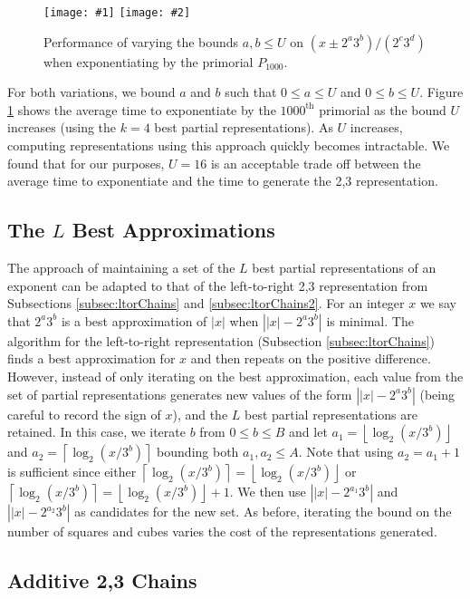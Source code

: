 \documentclass{ucalgthes1}
\theoremstyle{definition}
\newcommand{\floor}[1]{\left\lfloor #1 \right\rfloor}
\newcommand{\ceil}[1]{\left\lceil #1 \right\rceil}
\newcommand{\mygraphTwo}[4]{
	\begin{figure}[H]
	\centering
	\texttt{[image: \#1]}
	\texttt{[image: \#2]}
	\caption{#4}
	\label{#3}
	\end{figure}
}
\begin{document}
\mygraphTwo{pm2a3b_vary_max-64}{pm2a3b_vary_max-128}{fig:pm2a3bVaryMax}{Performance of varying the bounds $a, b \le U$ on $(x \pm 2^a3^b)/(2^c3^d)$ when exponentiating by the primorial $P_{1000}$.}
For both variations, we bound $a$ and $b$ such that $0 \le a \le U$ and $0 \le b \le U$.  Figure \ref{fig:pm2a3bVaryMax} shows the average time to exponentiate by the $1000^{\textrm{th}}$ primorial as the bound $U$ increases (using the $k=4$ best partial representations).  As $U$ increases, computing representations using this approach quickly becomes intractable.  We found that for our purposes, $U=16$ is an acceptable trade off between the average time to exponentiate and the time to generate the 2,3 representation.


\subsection{The $L$ Best Approximations}

The approach of maintaining a set of the $L$ best partial representations of an exponent can be adapted to that of the left-to-right 2,3 representation from Subsections \ref{subsec:ltorChains} and \ref{subsec:ltorChains2}.  For an integer $x$ we say that $2^a3^b$ is a best approximation of $|x|$ when $\left||x| - 2^a3^b \right|$ is minimal.  The algorithm for the left-to-right representation (Subsection \ref{subsec:ltorChains}) finds a best approximation for $x$ and then repeats on the positive difference. However, instead of only iterating on the best approximation, each value from the set of partial representations generates new values of the form $\left||x| - 2^a3^b\right|$ (being careful to record the sign of $x$), and the $L$ best partial representations are retained.  In this case, we iterate $b$ from $0 \le b \le B$ and let $a_1 = \floor{\log_2 (x/3^b)}$ and $a_2 = \ceil{\log_2 (x/3^b)}$ bounding both $a_1, a_2 \le A$.  Note that using $a_2 = a_1 + 1$ is sufficient since either $\ceil{\log_2 (x/3^b)} = \floor{\log_2 (x/3^b)}$ or $\ceil{\log_2 (x/3^b)} = \floor{\log_2 (x/3^b)} + 1$.  We then use $\left||x|-2^{a_1}3^b\right|$ and $\left||x|-2^{a_2}3^b\right|$ as candidates for the new set.  As before, iterating the bound on the number of squares and cubes varies the cost of the representations generated.  


\subsection{Additive 2,3 Chains}
\label{subsec:addChains}
\end{document}
